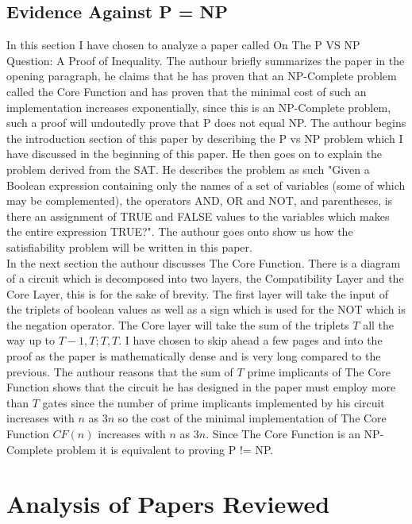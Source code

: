 \documentclass{report}
\begin{document}
\subsection{Evidence Against P = NP}
In this section I have chosen to analyze a paper called On The P VS NP Question: A Proof of Inequality\cite{P!=NP}.  The authour briefly summarizes the paper in the opening paragraph, he claims that he has proven that an NP-Complete problem called the Core Function and has proven that the minimal cost of such an implementation increases exponentially, since this is an NP-Complete problem, such a proof will undoutedly prove that P does not equal NP.
The authour begins the introduction section of this paper by describing the P vs NP problem which I have discussed in the beginning of this paper.  He then goes on to explain the problem derived from the SAT\cite{satisfiability}.  He describes the problem as such "Given a Boolean expression containing only the names of a set of variables (some of which may be complemented), the operators AND, OR and NOT, and parentheses, is there an assignment of TRUE and FALSE values to the variables which makes the entire expression TRUE?"\cite{P!=NP}.  The authour goes onto show us how the satisfiability problem will be written in this paper.
\\
In the next section the authour discusses The Core Function.  There is a diagram of a circuit which is decomposed into two layers, the Compatibility Layer and the Core Layer, this is for the sake of brevity.  The first layer will take the input of the triplets of boolean values as well as a sign which is used for the NOT which is the negation operator.  The Core layer will take the sum of the triplets $T$ all the way up to $T - 1, T; T, T$.  I have chosen to skip ahead a few pages and into the proof as the paper is mathematically dense and is very long compared to the previous.  The authour reasons that the sum of $T$ prime implicants of The Core Function shows that the circuit he has designed in the paper must employ more than $T$ gates since the number of prime implicants implemented by his circuit increases with $n$ as $3n$ so the cost of the minimal implementation of The Core Function $CF(n)$ increases with $n$ as $3n$.  Since The Core Function is an NP-Complete problem it is equivalent to proving P != NP.
\section{Analysis of Papers Reviewed}
\end{document}
